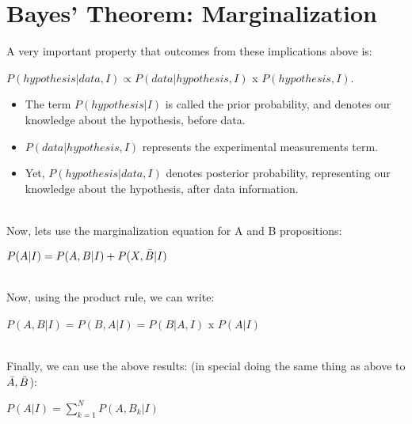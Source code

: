 \documentclass[oneside]{book}
\begin{document}
\section*{Bayes' Theorem: Marginalization}

A very important property that outcomes from these implications above is:

\begin{center}
    $P(hypothesis|data, I) \propto P(data|hypothesis, I)$ x $P(hypothesis, I)$.
    
\end{center}
\begin{itemize}
    

    

\item The term $P(hypothesis|I)$ is called the prior probability, and denotes our knowledge about the hypothesis, before data.\\ \item $P(data|hypothesis, I)$ represents the experimental measurements term.\\ \item Yet,  $P(hypothesis|data,I)$ denotes posterior probability, representing our knowledge about the hypothesis, after data information.

\end{itemize}

\\

Now, lets use the marginalization equation for A and B propositions:

\begin{center}
    $P(A|I) = P(A,B|I) + P(X,\Bar{B}|I)$
\end{center}
\\
\hspace*{0.6 cm} Now, using the product rule, we can write:

\begin{center}
    $P(A,B|I) = P(B,A|I) = P(B|A,I)$ x $P(A|I)$
\end{center}

\\

Finally, we can use the above results: (in special doing the same thing as above to $\Bar{A}, \Bar{B}$):

\begin{center}
    $P(A|I) = \sum_{k=1}^{N} P(A,B_{k}|I)$
\end{center}
\end{document}
